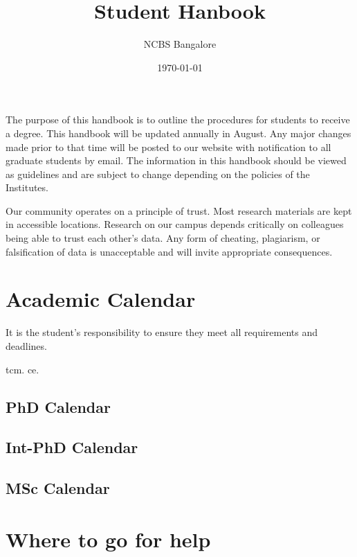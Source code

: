 \documentclass[a4paper]{extarticle}
\author{NCBS Bangalore}
\title{Student Hanbook}
\date{\today}
\begin{document}
The purpose of this handbook is to outline the procedures for students to receive a degree.
This handbook will be updated annually in August. Any major changes made prior to that
time will be posted to our website with notification to all graduate students by email. The
information in this handbook should be viewed as guidelines and are subject to change
depending on the policies of the Institutes.

\vspace{10cm}

\begin{mdframed}[frametitle=\textsc{Honor Code},backgroundcolor=yellow!20]
Our community operates on a principle of trust. Most research materials are kept
in accessible locations. Research on our campus depends critically on colleagues
being able to trust each other’s data.  Any form of cheating, plagiarism, or
falsification of data is unacceptable and will invite appropriate consequences.
\end{mdframed}

\newpage
\tableofcontents 

\newpage
\section{Academic Calendar}
\label{sec:academic_calendar}

It is the student’s responsibility to ensure they meet all requirements and
deadlines. 

\gls{tcm}. \gls{ce}.

\subsection{PhD Calendar}


\subsection{Int-PhD Calendar}


\subsection{MSc Calendar}


\newpage
\section{Where to go for help}
\end{document}
